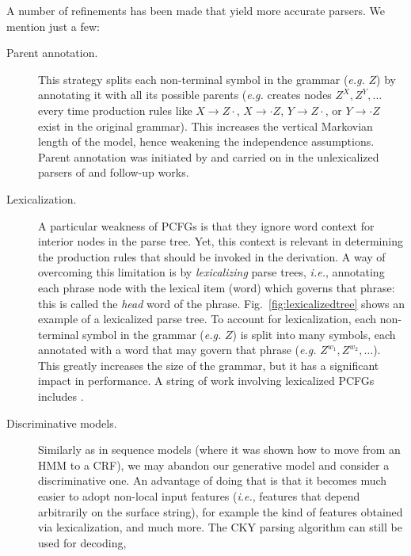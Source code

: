 A number of refinements has been made that yield more accurate parsers. We mention just a few: 
\begin{description}
\item[Parent annotation.] This strategy splits each non-terminal symbol in the grammar (\emph{e.g.} $Z$) by annotating it with all its possible parents 
(\emph{e.g.} creates nodes $Z^X, Z^Y, \ldots$ every time production rules like 
$X \rightarrow Z \cdot$, $X \rightarrow \cdot Z$, $Y \rightarrow Z \cdot$, or $Y \rightarrow \cdot Z$ exist in the original grammar). 
This increases the vertical Markovian length of the model, hence weakening the independence assumptions. Parent annotation was initiated 
by \citet{Johnson1998} and carried on in the unlexicalized parsers of \citet{Klein2003} and follow-up works. 
\item[Lexicalization.] A particular weakness of PCFGs is that they ignore word context for interior nodes in the parse tree. 
Yet, this context is relevant in determining the production rules that should be invoked in the derivation. A way of overcoming this limitation 
is by \emph{lexicalizing} parse trees, \emph{i.e.}, annotating each phrase node with the lexical item (word) which governs that phrase: this is called the \emph{head} word of 
the phrase. Fig.~\ref{fig:lexicalizedtree} shows an example of a lexicalized parse tree. 
To account for lexicalization, each non-terminal symbol in the grammar (\emph{e.g.} $Z$) is split into many symbols, each annotated with a word that may govern that phrase 
(\emph{e.g.} $Z^{w_1},Z^{w_2},\ldots$).  This greatly increases the size of the grammar, but it has a significant impact in performance. 
A string of work involving lexicalized PCFGs includes \citet{Magerman1995,Charniak1997,Collins1999}. 
\item[Discriminative models.] Similarly as in sequence models (where it was shown how to move from an HMM to a CRF), we may abandon our generative model and 
consider a discriminative one. An advantage of doing that is that it becomes much easier to adopt non-local input features (\emph{i.e.}, features that depend arbitrarily 
on the surface string), for example the kind of features obtained via lexicalization, and much more. The CKY parsing algorithm can still be used for decoding, 

\end{description}

